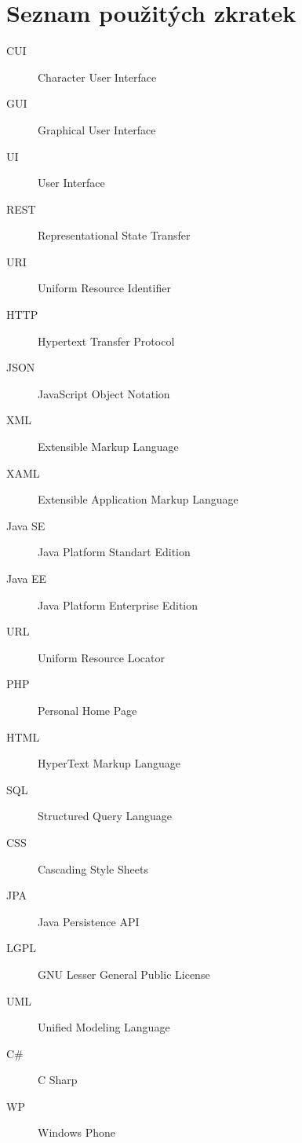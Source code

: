 \chapter{Seznam použitých zkratek}

\begin{description}
\item[CUI] Character User Interface
\item[GUI] Graphical User Interface
\item[UI] User Interface
\item[REST] Representational State Transfer
\item[URI] Uniform Resource Identifier
\item[HTTP] Hypertext Transfer Protocol
\item[JSON] JavaScript Object Notation
\item[XML] Extensible Markup Language
\item[XAML] Extensible Application Markup Language 
\item[Java SE] Java Platform Standart Edition
\item[Java EE] Java Platform Enterprise Edition
\item[URL] Uniform Resource Locator
\item[PHP] Personal Home Page
\item[HTML] HyperText Markup Language
\item[SQL] Structured Query Language
\item[CSS] Cascading Style Sheets
\item[JPA] Java Persistence API
\item[LGPL] GNU Lesser General Public License 
\item[UML] Unified Modeling Language
\item[C\#] C Sharp
\item[WP] Windows Phone


\end{description}